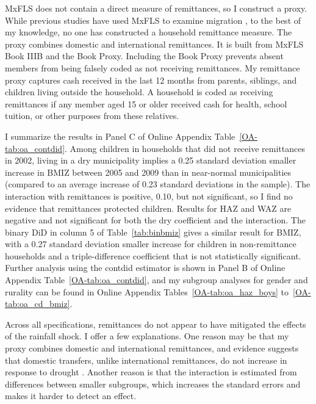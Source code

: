 MxFLS does not contain a direct measure of remittances, so I construct a proxy. While previous studies have used MxFLS to examine migration \parencite{creightonMigrantNetworksPathways2011,damonChildhoodObesityMexico2014}, to the best of my knowledge, no one has constructed a household remittance measure. The proxy combines domestic and international remittances. It is built from MxFLS Book IIIB and the Book Proxy. Including the Book Proxy prevents absent members from being falsely coded as not receiving remittances. My remittance proxy captures cash received in the last 12 months from parents, siblings, and children living outside the household. A household is coded as receiving remittances if any member aged 15 or older received cash for health, school tuition, or other purposes from these relatives.

I summarize the results in Panel C of Online Appendix Table~\ref{OA-tab:oa_contdid}. Among children in households that did not receive remittances in 2002, living in a dry municipality implies a 0.25 standard deviation smaller increase in BMIZ between 2005 and 2009 than in near-normal municipalities (compared to an average increase of 0.23 standard deviations in the sample). The interaction with remittances is positive, 0.10, but not significant, so I find no evidence that remittances protected children. Results for HAZ and WAZ are negative and not significant for both the dry coefficient and the interaction. The binary DiD in column 5 of Table~\ref{tab:binbmiz} gives a similar result for BMIZ, with a 0.27 standard deviation smaller increase for children in non-remittance households and a triple-difference coefficient that is not statistically significant. Further analysis using the contdid estimator is shown in Panel B of Online Appendix Table~\ref{OA-tab:oa_contdid}, and my subgroup analyses for gender and rurality can be found in Online Appendix Tables~\ref{OA-tab:oa_haz_boys} to~\ref{OA-tab:oa_cd_bmiz}.

Across all specifications, remittances do not appear to have mitigated the effects of the rainfall shock. I offer a few explanations. One reason may be that my proxy combines domestic and international remittances, and evidence suggests that domestic transfers, unlike international remittances, do not increase in response to drought \parencite{smithClimateChangeViolence2025}. Another reason is that the interaction is estimated from differences between smaller subgroups, which increases the standard errors and makes it harder to detect an effect.

